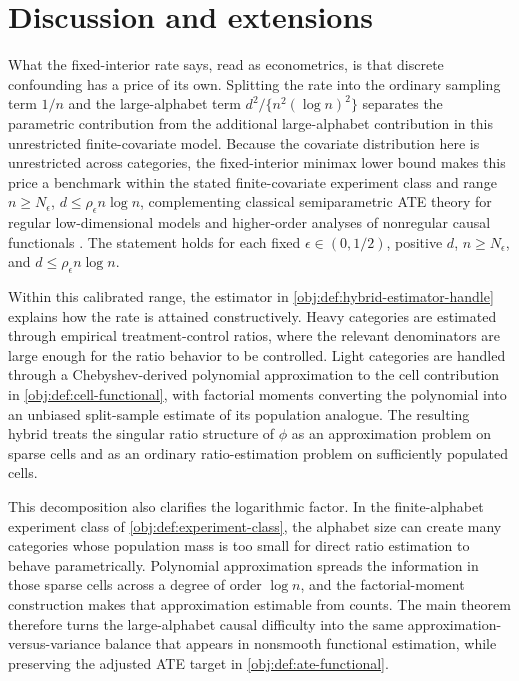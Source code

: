 \section{Discussion and extensions}

What the fixed-interior rate says, read as econometrics, is that discrete confounding has a price of its own. Splitting the rate into the ordinary sampling term \(1/n\) and the large-alphabet term \(d^2/\{n^2(\log n)^2\}\) separates the parametric contribution from the additional large-alphabet contribution in this unrestricted finite-covariate model. Because the covariate distribution here is unrestricted across categories, the fixed-interior minimax lower bound makes this price a benchmark within the stated finite-covariate experiment class and range \(n\ge N_\epsilon\), \(d\le\rho_\epsilon n\log n\), complementing classical semiparametric ATE theory for regular low-dimensional models \citep{Hahn1998,HiranoImbensRidder2003,RobinsRotnitzkyZhao1994,BangRobins2005,VanDerLaanRubin2006} and higher-order analyses of nonregular causal functionals \citep{Robins2008,Robins2009,Robins2017,LiuMukherjeeNeweyRobins2017,Kennedy2024}. The statement holds for each fixed \(\epsilon\in(0,1/2)\), positive \(d\), \(n\ge N_\epsilon\), and \(d\le\rho_\epsilon n\log n\).

Within this calibrated range, the estimator in \cref{obj:def:hybrid-estimator-handle} explains how the rate is attained constructively. Heavy categories are estimated through empirical treatment-control ratios, where the relevant denominators are large enough for the ratio behavior to be controlled. Light categories are handled through a Chebyshev-derived polynomial approximation to the cell contribution in \cref{obj:def:cell-functional}, with factorial moments converting the polynomial into an unbiased split-sample estimate of its population analogue. The resulting hybrid treats the singular ratio structure of \(\phi\) as an approximation problem on sparse cells and as an ordinary ratio-estimation problem on sufficiently populated cells.

This decomposition also clarifies the logarithmic factor. In the finite-alphabet experiment class of \cref{obj:def:experiment-class}, the alphabet size can create many categories whose population mass is too small for direct ratio estimation to behave parametrically. Polynomial approximation spreads the information in those sparse cells across a degree of order \(\log n\), and the factorial-moment construction makes that approximation estimable from counts. The main theorem therefore turns the large-alphabet causal difficulty into the same approximation-versus-variance balance that appears in nonsmooth functional estimation, while preserving the adjusted ATE target in \cref{obj:def:ate-functional}.

